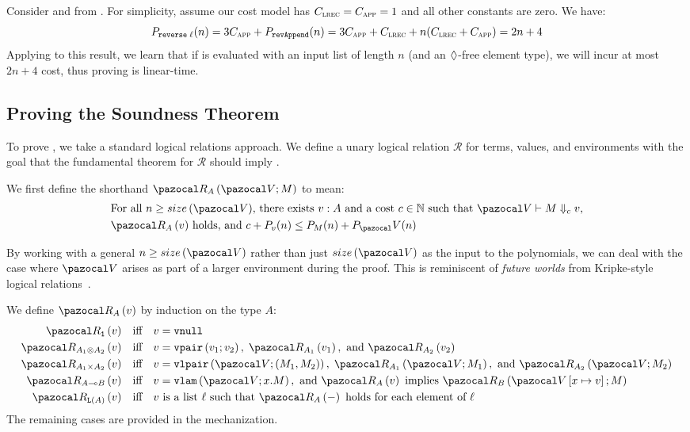 \begin{example}
Consider  and  from . For simplicity, assume our cost model has $C_{\textsc{lrec}} = C_{\textsc{app}} = 1$ and all other constants are zero. We have:
\[ P_\code{\tmapp{reverse}{\ell}}(n) = 3\Capp + P_\code{revAppend}(n) = 3\Capp + \Crec + n(\Crec + \Capp) = 2n + 4 \]
Applying  to this result, we learn that if  is evaluated with an input list of length $n$ (and an $\tpdiam$-free element type), we will incur at most $2n + 4$ cost, thus proving  is linear-time.
\end{example}



\subsection{Proving the Soundness Theorem}
\label{sec:proving-general-soundness}

To prove , we take a standard logical relations approach. We define a unary logical relation $\mathcal R$ for terms, values, and environments with the goal that the fundamental theorem for $\mathcal R$ should imply .

\begin{definition}
We first define the shorthand $\Rterm{A}{\env}{M}$ to mean:
\begin{align*}
&\text{For all $n \ge \envsize{\env}$, there exists $v : A$ and a cost $c \in \mathbb N$ such that $\evals{\env}{M}{c}{v}$,} \\
&\text{$\Rval{A}{v}$ holds, and $c + P_v(n) \le P_M(n) + P_\env(n)$}
\end{align*}
\end{definition}
By working with a general $n \ge \envsize{\env}$ rather than just $\envsize{\env}$ as the input to the polynomials, we can deal with the case where $\env$ arises as part of a larger environment during the proof. This is reminiscent of \emph{future worlds} from Kripke-style logical relations~\cite{Mitchell1991}.

\begin{definition}
We define $\Rval{A}{v}$ by induction on the type $A$:
\begin{align*}
\Rval{\tpunit}{v} &\quad \text{iff} \quad v = \vnull \\
\Rval{\tptens{A_1}{A_2}}{v} &\quad \text{iff} \quad v = \vpair{v_1}{v_2}, \; \Rval{A_1}{v_1}, \text{ and } \Rval{A_2}{v_2} \\
\Rval{\tpprod{A_1}{A_2}}{v} &\quad \text{iff} \quad v = \vrecord{\env}{M_1}{M_2}, \; \Rterm{A_1}{\env}{M_1}, \text{ and } \Rterm{A_2}{\env}{M_2} \\
\Rval{\tparr{A}{B}}{v} &\quad \text{iff} \quad v = \vlam{\env}{x}{M}, \text{ and } \Rval{A}{v} \text{ implies } \Rterm{B}{\envcons{\env}{x}{v}}{M} \\
\Rval{\tplist{A}}{v} &\quad \text{iff} \quad \text{$v$ is a list $\ell$ such that } \Rval{A}{-} \text{ holds for each element of $\ell$ }
\end{align*}
The remaining cases are provided in the mechanization.
\end{definition}

